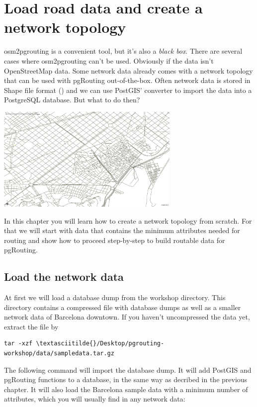 \documentclass[a4paper,10pt,english]{manual}
\begin{document}
\resetcurrentobjects
\hypertarget{--doc-chapters/topology}{}

\chapter{Load road data and create a network topology}

osm2pgrouting is a convenient tool, but it's also a \emph{black box}. There are several cases where osm2pgrouting can't be used. Obviously if the data isn't OpenStreetMap data. Some network data already comes with a network topology that can be used with pgRouting out-of-the-box. Often network data is stored in Shape file format () and we can use PostGIS'  converter to import the data into a PostgreSQL database. But what to do then?

{\hfill\includegraphics[width=250pt]{network.png}\hfill}

In this chapter you will learn how to create a network topology from scratch. For that we will start with data that contains the minimum attributes needed for routing and show how to proceed step-by-step to build routable data for pgRouting.


\section{Load the network data}

At first we will load a database dump from the workshop  directory. This directory contains a compressed file with database dumps as well as a smaller network data of Barcelona downtown. If you haven't uncompressed the data yet, extract the file by

\begin{Verbatim}[commandchars=\\\{\}]
tar -xzf \textasciitilde{}/Desktop/pgrouting-workshop/data/sampledata.tar.gz
\end{Verbatim}

The following command will import the database dump. It will add PostGIS and pgRouting functions to a database, in the same way as decribed in the previous chapter. It will also load the Barcelona sample data with a minimum number of attributes, which you will usually find in any network data:
\end{document}
